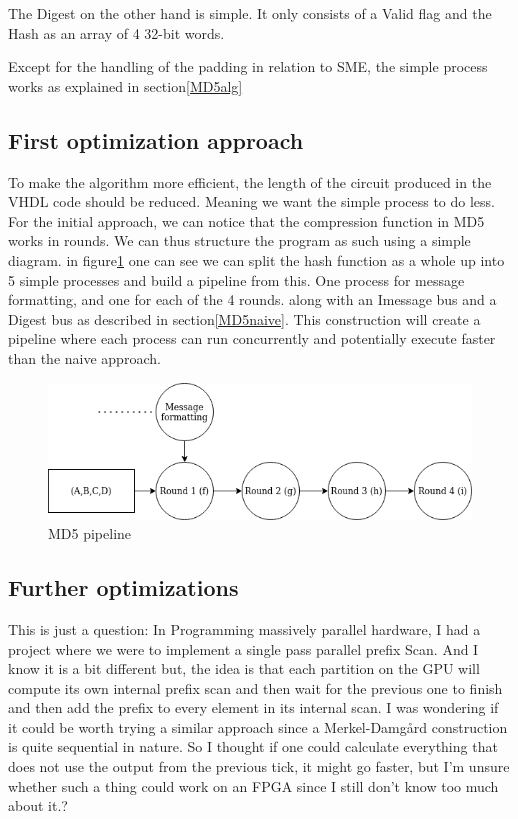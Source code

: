 \documentclass[11pt]{article}
\begin{document}
The Digest on the other hand is simple. It only consists of a Valid flag and the Hash as an array of 4 32-bit words.

Except for the handling of the padding in relation to SME, the simple process works as explained in section\ref{MD5alg}

\subsection{First optimization approach}
\label{sec:org1bc52ee}
To make the algorithm more efficient, the length of the circuit produced in the VHDL code should be reduced. Meaning we want the simple process to do less. For the initial approach, we can notice that the compression function in MD5 works in rounds. We can thus structure the program as such using a simple diagram. in figure\ref{fig:MD5opt1} one can see we can split the hash function as a whole up into 5 simple processes and build a pipeline from this. One process for message formatting, and one for each of the 4 rounds. along with an Imessage bus and a Digest bus as described in section\ref{MD5naive}. This construction will create a pipeline where each process can run concurrently and potentially execute faster than the naive approach.
\begin{figure}[htbp]
\centering
\includegraphics[width=.9\linewidth]{./MD5.png}
\caption{\label{fig:MD5opt1}MD5 pipeline}
\end{figure}

\subsection{Further optimizations}
\label{sec:org1d8a049}
This is just a question:
In Programming massively parallel hardware, I had a project where we were to implement a single pass parallel prefix Scan. And I know it is a bit different but, the idea is that each partition on the GPU will compute its own internal prefix scan and then wait for the previous one to finish and then add the prefix to every element in its internal scan. I was wondering if it could be worth trying a similar approach since a Merkel-Damgård construction is quite sequential in nature. So I thought if one could calculate everything that does not use the output from the previous tick, it might go faster, but I'm unsure whether such a thing could work on an FPGA since I still don't know too much about it.?
\end{document}
